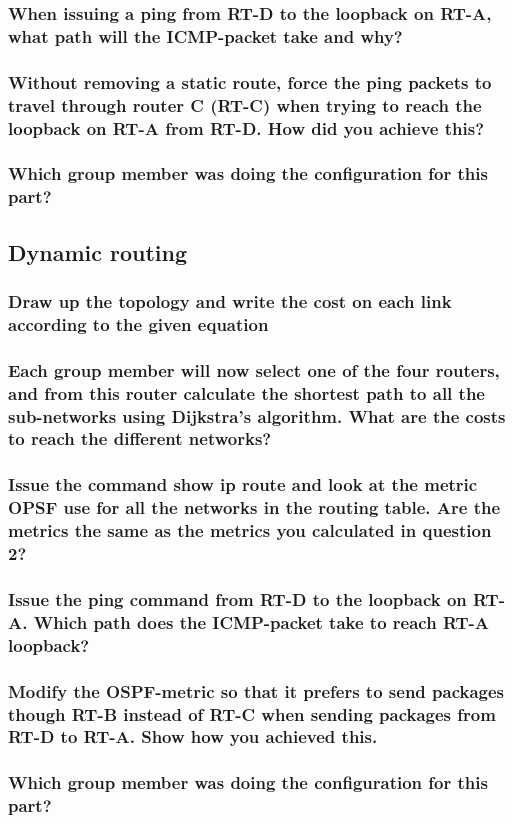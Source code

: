 \documentclass[a4paper, titlepage,12pt]{article}
\begin{document}
		\subsubsection{When issuing a ping from RT-D to the loopback on RT-A, what path will the ICMP-packet take and why?}

		\subsubsection{Without removing a static route, force the ping packets to travel through router C (RT-C) when trying to reach the loopback on RT-A from RT-D. How did you achieve this?}

		\subsubsection{Which group member was doing the configuration for this part?}

		\subsection{Dynamic routing}

		\subsubsection{Draw up the topology and write the cost on each link according to the given equation}

		\subsubsection{Each group member will now select one of the four routers, and from this router calculate the shortest path to all the sub-networks using Dijkstra's algorithm. What are the costs to reach the different networks?}

		\subsubsection{Issue the command show ip route and look at the metric OPSF use for all the networks in the routing table. Are the metrics the same as the metrics you calculated in question 2?}

		\subsubsection{Issue the ping command from RT-D to the loopback on RT-A. Which path does the ICMP-packet take to reach RT-A loopback?}

		\subsubsection{Modify the OSPF-metric so that it prefers to send packages though RT-B instead of RT-C when sending packages from RT-D to RT-A. Show how you achieved this.}

		\subsubsection{Which group member was doing the configuration for this part?}
\end{document}
